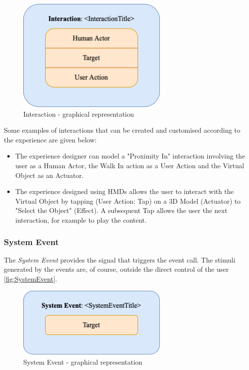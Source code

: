 \begin{figure}[h]
	\centering
	\includegraphics[width=7.5cm]{Figures/Conceptual Model/InteractionBlock.png}
	\caption{Interaction - graphical representation}
	\label{fig:InteractionBlock}
\end{figure}

Some examples of interactions that can be created and customised according to the experience are given below: 
\begin{itemize}
    \item The experience designer can model a "Proximity In" interaction involving the user as a Human Actor, the Walk In action as a User Action and the Virtual Object as an Actuator. 
    \item The experience designed using HMDs allows the user to interact with the Virtual Object by tapping (User Action: Tap) on a 3D Model (Actuator) to "Select the Object" (Effect). A subsequent Tap allows the user the next interaction, for example to play the content. 
\end{itemize}

\subsubsection*{System Event}
The \emph{System Event} provides the signal that triggers the event call. The stimuli generated by the events are, of course, outside the direct control of the user \autoref{fig:SystemEvent}.
\begin{figure}[h]
	\centering
	\includegraphics[width=7.5cm]{Figures/Conceptual Model/SystemEvent.png}
	\caption{System Event - graphical representation}
	\label{fig:SystemEvent}
\end{figure}

